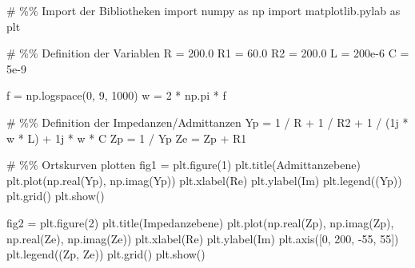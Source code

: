 \documentclass[
  ngerman,
  letterpaper,
]{scrbook}
\newenvironment{Shaded}{}{}
\newcommand{\CommentTok}[1]{\textcolor[rgb]{0.42,0.45,0.49}{#1}}
\newcommand{\DecValTok}[1]{\textcolor[rgb]{0.00,0.36,0.77}{#1}}
\newcommand{\FloatTok}[1]{\textcolor[rgb]{0.00,0.36,0.77}{#1}}
\newcommand{\ImportTok}[1]{\textcolor[rgb]{0.01,0.18,0.38}{#1}}
\newcommand{\NormalTok}[1]{\textcolor[rgb]{0.14,0.16,0.18}{#1}}
\newcommand{\OperatorTok}[1]{\textcolor[rgb]{0.14,0.16,0.18}{#1}}
\newcommand{\OtherTok}[1]{\textcolor[rgb]{0.44,0.26,0.76}{#1}}
\newcommand{\StringTok}[1]{\textcolor[rgb]{0.01,0.18,0.38}{#1}}
\begin{document}
\begin{Shaded}
\begin{Highlighting}[]
\CommentTok{\# \%\% Import der Bibliotheken}
\ImportTok{import}\NormalTok{ numpy }\ImportTok{as}\NormalTok{ np}
\ImportTok{import}\NormalTok{ matplotlib.pylab }\ImportTok{as}\NormalTok{ plt}

\CommentTok{\# \%\% Definition der Variablen}
\NormalTok{R }\OperatorTok{=} \FloatTok{200.0}
\NormalTok{R1 }\OperatorTok{=} \FloatTok{60.0}
\NormalTok{R2 }\OperatorTok{=} \FloatTok{200.0}
\NormalTok{L }\OperatorTok{=} \FloatTok{200e{-}6}
\NormalTok{C }\OperatorTok{=} \FloatTok{5e{-}9}

\NormalTok{f }\OperatorTok{=}\NormalTok{ np.logspace(}\DecValTok{0}\NormalTok{, }\DecValTok{9}\NormalTok{, }\DecValTok{1000}\NormalTok{)}
\NormalTok{w }\OperatorTok{=} \DecValTok{2} \OperatorTok{*}\NormalTok{ np.pi }\OperatorTok{*}\NormalTok{ f}

\CommentTok{\# \%\% Definition der Impedanzen/Admittanzen}
\NormalTok{Yp }\OperatorTok{=} \DecValTok{1} \OperatorTok{/}\NormalTok{ R }\OperatorTok{+} \DecValTok{1} \OperatorTok{/}\NormalTok{ R2 }\OperatorTok{+} \DecValTok{1} \OperatorTok{/}\NormalTok{ (}\OtherTok{1j} \OperatorTok{*}\NormalTok{ w }\OperatorTok{*}\NormalTok{ L) }\OperatorTok{+} \OtherTok{1j} \OperatorTok{*}\NormalTok{ w }\OperatorTok{*}\NormalTok{ C}
\NormalTok{Zp }\OperatorTok{=} \DecValTok{1} \OperatorTok{/}\NormalTok{ Yp}
\NormalTok{Ze }\OperatorTok{=}\NormalTok{ Zp }\OperatorTok{+}\NormalTok{ R1}

\CommentTok{\# \%\% Ortskurven plotten}
\NormalTok{fig1 }\OperatorTok{=}\NormalTok{ plt.figure(}\DecValTok{1}\NormalTok{)}
\NormalTok{plt.title(}\StringTok{\textquotesingle{}Admittanzebene\textquotesingle{}}\NormalTok{)}
\NormalTok{plt.plot(np.real(Yp), np.imag(Yp))}
\NormalTok{plt.xlabel(}\StringTok{\textquotesingle{}Re\textquotesingle{}}\NormalTok{)}
\NormalTok{plt.ylabel(}\StringTok{\textquotesingle{}Im\textquotesingle{}}\NormalTok{)}
\NormalTok{plt.legend((}\StringTok{\textquotesingle{}Yp\textquotesingle{}}\NormalTok{))}
\NormalTok{plt.grid()}
\NormalTok{plt.show()}

\NormalTok{fig2 }\OperatorTok{=}\NormalTok{ plt.figure(}\DecValTok{2}\NormalTok{)}
\NormalTok{plt.title(}\StringTok{\textquotesingle{}Impedanzebene\textquotesingle{}}\NormalTok{)}
\NormalTok{plt.plot(np.real(Zp), np.imag(Zp), np.real(Ze), np.imag(Ze))}
\NormalTok{plt.xlabel(}\StringTok{\textquotesingle{}Re\textquotesingle{}}\NormalTok{)}
\NormalTok{plt.ylabel(}\StringTok{\textquotesingle{}Im\textquotesingle{}}\NormalTok{)}
\NormalTok{plt.axis([}\DecValTok{0}\NormalTok{, }\DecValTok{200}\NormalTok{, }\OperatorTok{{-}}\DecValTok{55}\NormalTok{, }\DecValTok{55}\NormalTok{])}
\NormalTok{plt.legend((}\StringTok{\textquotesingle{}Zp\textquotesingle{}}\NormalTok{, }\StringTok{\textquotesingle{}Ze\textquotesingle{}}\NormalTok{))}
\NormalTok{plt.grid()}
\NormalTok{plt.show()}
\end{Highlighting}
\end{Shaded}
\end{document}
